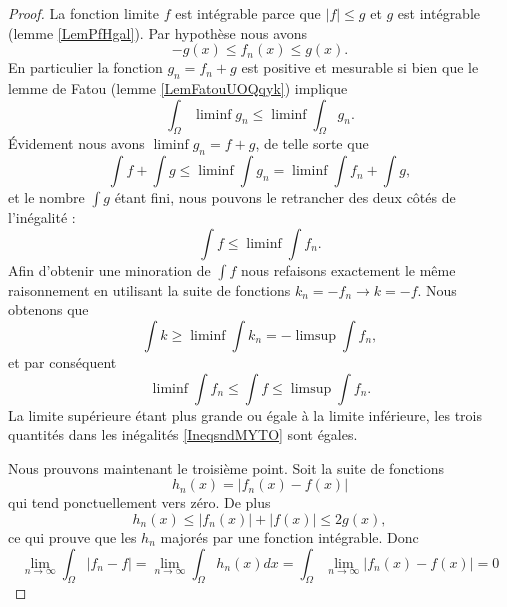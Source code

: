 \begin{proof}

    La fonction limite \( f\) est intégrable parce que \( | f |\leq g\) et \( g\) est intégrable (lemme \ref{LemPfHgal}). Par hypothèse nous avons
    \begin{equation}
        -g(x)\leq f_n(x)\leq g(x).
    \end{equation}
    En particulier la fonction \( g_n=f_n+g\) est positive et mesurable si bien que le lemme de Fatou (lemme \ref{LemFatouUOQqyk}) implique
    \begin{equation}
        \int_{\Omega}\liminf g_n\leq\liminf\int_{\Omega}g_n.
    \end{equation}
    Évidement nous avons \( \liminf g_n=f+g\), de telle sorte que
    \begin{equation}
        \int f+\int g\leq \liminf\int g_n=\liminf\int f_n+\int g,
    \end{equation}
    et le nombre \( \int g\) étant fini, nous pouvons le retrancher des deux côtés de l'inégalité :
    \begin{equation}
        \int f\leq\liminf\int f_n.
    \end{equation}
    Afin d'obtenir une minoration de \( \int f\) nous refaisons exactement le même raisonnement en utilisant la suite de fonctions \( k_n=-f_n\to k=-f\). Nous obtenons que
    \begin{equation}
        \int k\geq\liminf\int k_n=-\limsup\int f_n,
    \end{equation}
    et par conséquent
    \begin{equation}    \label{IneqsndMYTO}
        \liminf\int f_n\leq\int f\leq\limsup\int f_n.
    \end{equation}
    La limite supérieure étant plus grande ou égale à la limite inférieure, les trois quantités dans les inégalités \eqref{IneqsndMYTO} sont égales.

    Nous prouvons maintenant le troisième point. Soit la suite de fonctions
    \begin{equation}
        h_n(x)=| f_n(x)-f(x) |
    \end{equation}
    qui tend ponctuellement vers zéro. De plus
    \begin{equation}
    h_n(x)\leq | f_n(x) |+| f(x) |\leq 2g(x),
    \end{equation}
    ce qui prouve que les \( h_n\) majorés par une fonction intégrable. Donc
    \begin{equation}
        \lim_{n\to \infty} \int_{\Omega}| f_n-f |= \lim_{n\to \infty} \int_{\Omega}h_n(x)dx=\int_{\Omega}\lim_{n\to \infty} | f_n(x)-f(x) |=0
    \end{equation}
\end{proof}

